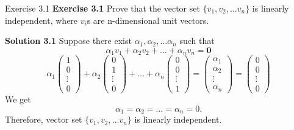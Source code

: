 \documentclass[aspectratio=169, UTF8]{ctexbeamer}
\begin{document}
\begin{frame}{Exercise 3.1}
    \textbf{Exercise 3.1} Prove that the vector set $\{ v_1, v_2,\dots v_n\}$ is linearly independent, where $v_i$s are n-dimensional unit vectors.
    \pause
    \par
    \textbf{Solution 3.1} Suppose there exist $\alpha_1,\alpha_2,\dots\alpha_n$ such that
    \begin{equation*}
        \alpha_1v_1+\alpha_2v_2+\dots+\alpha_nv_n=\mathbf{0}
    \end{equation*}
    \begin{equation*}
        \alpha_1\begin{pmatrix}
                    1\\ 0\\\vdots\\0
                \end{pmatrix}+\alpha_2\begin{pmatrix}
                    0\\ 1\\\vdots\\0
                \end{pmatrix}+\dots+\alpha_n\begin{pmatrix}
                    0\\ 0\\\vdots\\1
                \end{pmatrix}=\begin{pmatrix}
                    \alpha_1\\ \alpha_2\\ \vdots\\ \alpha_n
                \end{pmatrix}=\begin{pmatrix}
                    0\\ 0\\\vdots\\0
                \end{pmatrix}
    \end{equation*}
    We get 
    \begin{equation*}
        \alpha_1=\alpha_2=\dots=\alpha_n=0.
    \end{equation*}
    Therefore, vector set $\{ v_1, v_2,\dots v_n\}$ is linearly independent.
\end{frame}
\end{document}
